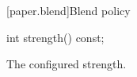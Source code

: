 [paper.blend]{Blend policy}

%
\begin{itemdecl}
int strength() const;
\end{itemdecl}

\begin{itemdescr}
\pnum
\returns
The configured strength.
\end{itemdescr}

